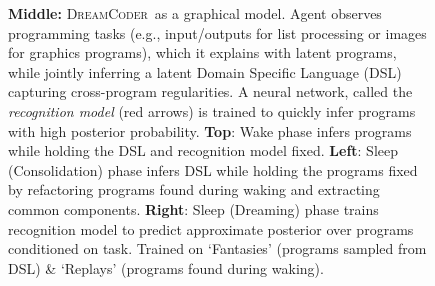 \documentclass{article}
\newcommand{\system}{\textsc{DreamCoder}~}
\newcommand{\probability}{\mathds{P}} %
\newtheorem{definition}{Definition}
\begin{document}
\begin{figure}
\begin{tikzpicture}[line width=0.4mm]
  \end{tikzpicture}
  \caption{\textbf{Middle:} \system as a graphical model. Agent observes programming tasks (e.g., input/outputs for list processing or images for graphics programs), which it explains with latent programs, while jointly inferring a latent Domain Specific Language (DSL) capturing cross-program regularities. A neural network, called the \emph{recognition model} (red arrows) is trained to quickly infer programs with high posterior probability. \textbf{Top}: Wake phase infers programs while holding the DSL and recognition model fixed. \textbf{Left}: Sleep (Consolidation) phase infers DSL while holding the programs fixed by refactoring programs found during waking and extracting common components. \textbf{Right}: Sleep (Dreaming) phase trains recognition model to predict approximate posterior over programs conditioned on task. Trained on `Fantasies' (programs sampled from DSL) \& `Replays' (programs found during waking).}\label{threeCycles}
\end{figure}



\end{document}
